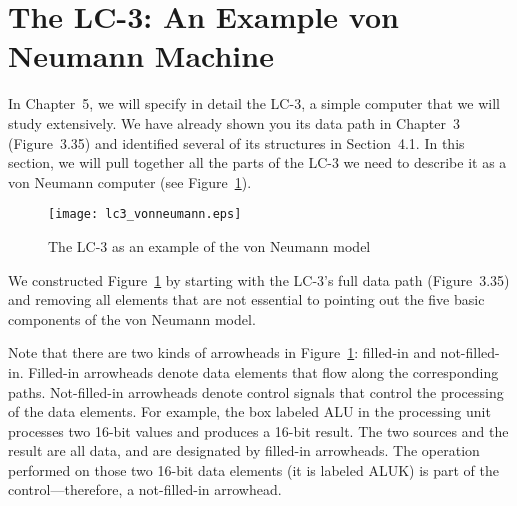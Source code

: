 \documentclass{patt}
\begin{document}
\vspace{-6pt}

\section{The LC-3: An Example von Neumann Machine}

In Chapter~5, we will specify in detail the LC-3, a simple
computer that we will study extensively.  We have already shown you its
data path in Chapter~3 (Figure~3.35) and identified several of its structures
in Section~4.1.  In this section, we will pull together all the parts of
the LC-3 we need to describe it as a von Neumann computer (see 
Figure~\ref{fig:lc3_vonneumann}).

\begin{figure}
\centerline{\texttt{[image: lc3\_vonneumann.eps]}}
\caption{The LC-3 as an example of the von Neumann model}
\label{fig:lc3_vonneumann}
\end{figure}

We constructed Figure~\ref{fig:lc3_vonneumann}
by starting with the LC-3's full data path (Figure~3.35) and removing
all elements that are not essential to pointing out the five basic components
of the von Neumann model.

Note that there are two kinds of arrowheads in Figure~\ref{fig:lc3_vonneumann}:
filled-in and not-filled-in.  Filled-in arrowheads denote data elements that
flow along the corresponding paths.  Not-filled-in arrowheads denote
control signals that control the processing of the data elements.  For
example, the box labeled ALU in the processing unit processes two
16-bit values and produces a 16-bit result.  The two sources and the
result are all data, and are designated by filled-in arrowheads.  The
operation performed on those two 16-bit data elements (it is labeled
ALUK) is part of the control---therefore, a not-filled-in arrowhead.
\end{document}
